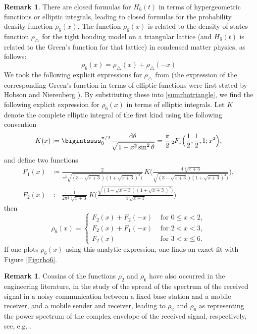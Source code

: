 \documentclass[12pt,reqno]{amsart}
\theoremstyle{definition}
\theoremstyle{plain}
\theoremstyle{definition}
\newtheorem{remark}[theorem]{Remark}
\renewcommand{\leq}{\leqslant}
\renewcommand{\d}{\mathrm{d}}
\newcommand{\hypgeo}[2]{
  {\vphantom{F}}_{#1}\kern-\scriptspace F_{#2}
}
\begin{document}
\begin{remark} There are closed formulas for $H_6(t)$ in terms of hypergeometric functions or elliptic integrals, leading to closed formulas for the probability density function $\rho_6(x)$. The function $\rho_6(x)$ is related to the density of states function $\rho_{\triangle}$  for the tight bonding model on a triangular lattice (and $H_6(t)$ is related to the Green's function for that lattice) in condensed matter physics, as follows: 
\begin{equation} \label{sumrhotriangle}
  \rho_6(x) = \rho_{\triangle}(x) + \rho_{\triangle}(-x) 
  \end{equation} 
We took the following explicit expressions for $\rho_\triangle$ from \cite{Kogan} (the expression of the corresponding Green's function in terms of elliptic functions were first stated by Hobson and Nierenberg \cite{HN}). 
By substituting these into \eqref{sumrhotriangle}, we find the following explicit expression for $\rho_6(x)$ in terms of elliptic integrals. 
Let $K$ denote the complete elliptic integral of the first kind using the following convention
$$ K(x) \coloneqq  \bigintssss_0^{\pi/2} \frac{\d\theta}{\sqrt{1-x^2 \sin^2 \theta}} = \frac{\pi}{2}\,  \hypgeo{2}{1}\Big(\frac12, \frac12,1;x^2\Big),$$ and define two functions 
\begin{align*} 
F_1(x) &\coloneqq \frac{2}{\pi^2 \sqrt{(3-\sqrt{x+3})(1+\sqrt{x+3})^3)}}\, K \Bigg(\frac{4\sqrt[4]{x+3}}{\sqrt{(3-\sqrt{x+3})(1+\sqrt{x+3})^3)}} \Bigg), \\[4mm] 
F_2(x) &\coloneqq \frac{1}{2 \pi^2 \sqrt[4]{x+3}}\, K \Bigg( \frac{\sqrt{(3-\sqrt{x+3})(1+\sqrt{x+3})^3)}}{4\sqrt[4]{x+3}} \Bigg)  
\end{align*} 
then 
\[
\rho_6(x) = \left\{ \begin{array}{ll} 
F_2(x)+F_2(-x) & \mbox{ for } 0 \leq x < 2, \\
F_2(x)+F_1(-x) & \mbox{ for } 2 <x < 3, \\
F_2(x)& \mbox{ for } 3 < x \leq 6.
\end{array} \right. 
\]
If one plots $\rho_6(x)$ using this analytic expression, one finds an exact fit with Figure \ref{Fig:rho6}. 
\end{remark}

\begin{remark} 
Cousins of the functions $\rho_2$ and $\rho_6$ have also occurred in the engineering literature, in the study of the spread of the spectrum of the received signal in a noisy communication between a fixed base station and a mobile receiver, and a mobile sender and receiver, leading to $\rho_2$ and $\rho_6$ as representing the power spectrum of the complex envelope of the received signal, respectively, see, e.g. \cite[p.~6, 2nd column]{Haber}. 
\end{remark} 
\end{document}
